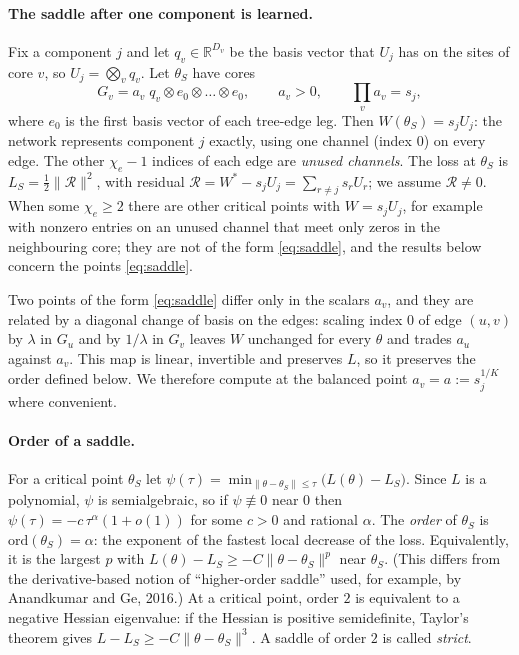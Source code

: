 \documentclass[11pt]{article}
\theoremstyle{definition}
\newcommand{\ord}{\mathrm{ord}}
\begin{document}
\paragraph{The saddle after one component is learned.} Fix a component $j$ and let $q_v\in\mathbb R^{D_v}$ be the
basis vector that $U_j$ has on the sites of core $v$, so $U_j=\bigotimes_vq_v$. Let $\theta_S$ have cores
\begin{equation}\label{eq:saddle}
G_v=a_v\;q_v\otimes e_0\otimes\dots\otimes e_0,\qquad a_v>0,\qquad \textstyle\prod_va_v=s_j,
\end{equation}
where $e_0$ is the first basis vector of each tree-edge leg. Then $W(\theta_S)=s_jU_j$: the network represents
component $j$ exactly, using one channel (index $0$) on every edge. The other $\chi_e-1$ indices of each edge are
\emph{unused channels}. The loss at $\theta_S$ is $L_S=\frac12\lVert\mathcal R\rVert^2$, with residual
$\mathcal R=W^*-s_jU_j=\sum_{r\ne j}s_rU_r$; we assume $\mathcal R\ne0$. When some $\chi_e\ge2$ there are other
critical points with $W=s_jU_j$, for example with nonzero entries on an unused channel that meet only zeros in the
neighbouring core; they are not of the form \eqref{eq:saddle}, and the results below concern the points
\eqref{eq:saddle}.

Two points of the form \eqref{eq:saddle} differ only in the scalars $a_v$, and they are related by a diagonal change
of basis on the edges: scaling index $0$ of edge $(u,v)$ by $\lambda$ in $G_u$ and by $1/\lambda$ in $G_v$ leaves $W$
unchanged for every $\theta$ and trades $a_u$ against $a_v$. This map is linear, invertible and preserves $L$, so it
preserves the order defined below. We therefore compute at the balanced point $a_v=a:=s_j^{1/K}$ where convenient.

\paragraph{Order of a saddle.} For a critical point $\theta_S$ let
$\psi(\tau)=\min_{\lVert\theta-\theta_S\rVert\le\tau}\big(L(\theta)-L_S\big)$. Since $L$ is a polynomial, $\psi$ is semialgebraic,
so if $\psi\not\equiv0$ near $0$ then $\psi(\tau)=-c\,\tau^{\alpha}(1+o(1))$ for some $c>0$ and rational $\alpha$. The \emph{order}
of $\theta_S$ is $\ord(\theta_S)=\alpha$: the exponent of the fastest local decrease of the loss. Equivalently, it is the
largest $p$ with $L(\theta)-L_S\ge-C\lVert\theta-\theta_S\rVert^p$ near $\theta_S$. (This differs from the derivative-based
notion of ``higher-order saddle'' used, for example, by Anandkumar and Ge, 2016.) At a critical point, order $2$ is
equivalent to a negative Hessian eigenvalue: if the Hessian is positive semidefinite, Taylor's theorem gives
$L-L_S\ge-C\lVert\theta-\theta_S\rVert^3$. A saddle of order $2$ is called \emph{strict}.
\end{document}
